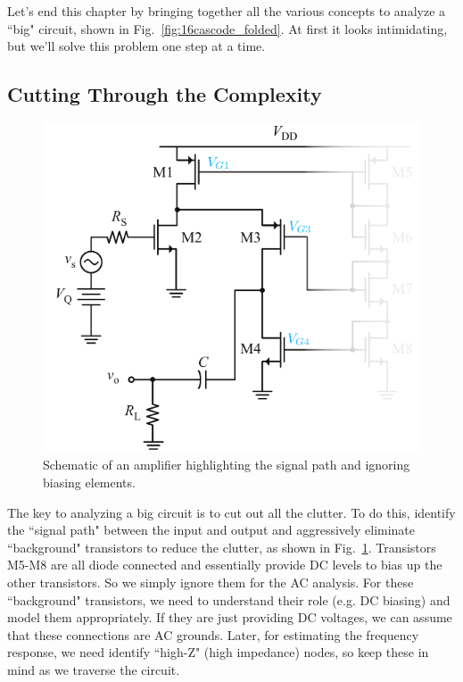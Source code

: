 Let's end this chapter by bringing together all the various concepts to analyze a ``big" circuit, shown in Fig.~\ref{fig:16cascode_folded}.  At first it looks intimidating, but we'll solve this problem one step at a time.
\subsection{Cutting Through the Complexity}
\begin{figure}[tb]
\begin{center}
\includegraphics[scale=1]{17cascode_folded_declutter}
\end{center}
\caption{Schematic of an amplifier highlighting the signal path and ignoring biasing elements.} \label{fig:17cascode_folded_declutter}
\end{figure}

The key to analyzing a big circuit is to cut out all the clutter.  To do this, identify the ``signal path" between the input and output and aggressively eliminate ``background" transistors to reduce the clutter, as shown in Fig.~\ref{fig:17cascode_folded_declutter}.  Transistors M5-M8 are all diode connected and essentially provide DC levels to bias up the other transistors.  So we simply ignore them for the AC analysis.  For these ``background" transistors, we need to understand their role (e.g. DC biasing) and model them appropriately.  If they are just providing DC voltages, we can assume that these connections are AC grounds.  Later, for estimating the frequency response, we need identify ``high-Z" (high impedance) nodes, so keep these in mind as we traverse the circuit.
